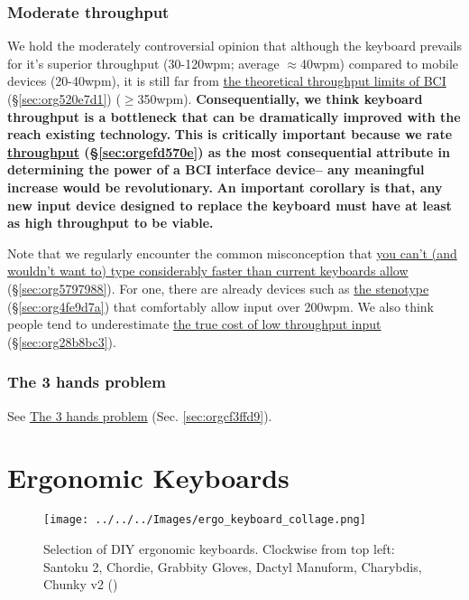 \documentclass[logo,bsc,singlespacing,parskip]{infthesis}
\begin{document}
\subsection{Moderate throughput}
\label{sec:org1d53679}
We hold the moderately controversial opinion that although the keyboard prevails for it's superior throughput (30-120wpm; average \(\approx\)40wpm) compared to mobile devices (20-40wpm), it is still far from \hyperref[sec:org520e7d1]{the theoretical throughput limits of BCI} (\S \ref{sec:org520e7d1}) (\(\ge\)350wpm).
\textbf{Consequentially, we think keyboard throughput is a bottleneck that can be dramatically improved with the reach existing technology.}
\textbf{This is critically important because we rate \hyperref[sec:orgefd570e]{throughput} (\S \ref{sec:orgefd570e}) as the most consequential attribute in determining the power of a BCI interface device-- any meaningful increase would be revolutionary.}
\textbf{An important corollary is that, any new input device designed to replace the keyboard must have at least as high throughput to be viable.}

Note that we regularly encounter the common misconception that \hyperref[sec:org5797988]{you can't (and wouldn't want to) type considerably faster than current keyboards allow} (\S \ref{sec:org5797988}).
For one, there are already devices such as \hyperref[sec:org4fe9d7a]{the stenotype} (\S \ref{sec:org4fe9d7a}) that comfortably allow input over 200wpm.
We also think people tend to underestimate \hyperref[sec:org28b8bc3]{the true cost of low throughput input} (\S \ref{sec:org28b8bc3}).

\subsection{The 3 hands problem}
\label{sec:org0542997}
See \hyperref[sec:orgcf3ffd9]{The 3 hands problem} (Sec. \ref{sec:orgcf3ffd9}).

\chapter{Ergonomic Keyboards}
\label{sec:org54595c7}
\begin{figure}[h]
\centering
\texttt{[image: ../../../Images/ergo\_keyboard\_collage.png]}
\caption[Collage of ergonomic keyboards]{\label{fig:ergo_collage}Selection of DIY ergonomic keyboards. Clockwise from top left: Santoku 2, Chordie, Grabbity Gloves, Dactyl Manuform, Charybdis, Chunky v2  (\autocite{ErgoMechBoards})}
\end{figure}
\end{document}
